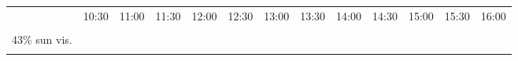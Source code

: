 \begin{figure}[!ht]
    \centering
    \setlength{\tabcolsep}{0pt}
    \newcommand{\customwidth}{.077\linewidth}
    \begin{tabular}{@{}rcccccccccccc@{}}
    &
    \begin{minipage}{\customwidth}\centering\scriptsize 10:30 \end{minipage} &
    \begin{minipage}{\customwidth}\centering\scriptsize 11:00 \end{minipage} &
    \begin{minipage}{\customwidth}\centering\scriptsize 11:30 \end{minipage} &
    \begin{minipage}{\customwidth}\centering\scriptsize 12:00 \end{minipage} &
    \begin{minipage}{\customwidth}\centering\scriptsize 12:30 \end{minipage} &
    \begin{minipage}{\customwidth}\centering\scriptsize 13:00 \end{minipage} &
    \begin{minipage}{\customwidth}\centering\scriptsize 13:30 \end{minipage} &
    \begin{minipage}{\customwidth}\centering\scriptsize 14:00 \end{minipage} &
    \begin{minipage}{\customwidth}\centering\scriptsize 14:30 \end{minipage} &
    \begin{minipage}{\customwidth}\centering\scriptsize 15:00 \end{minipage} &
    \begin{minipage}{\customwidth}\centering\scriptsize 15:30 \end{minipage} &
    \begin{minipage}{\customwidth}\centering\scriptsize 16:00 \end{minipage}
    \\
    \begin{sideways}\begin{minipage}{\customwidth}\centering \scriptsize illumination \\ 43\% sun vis. \\ \vspace{5pt} \end{minipage}\end{sideways} &

\end{tabular}
\end{figure}
